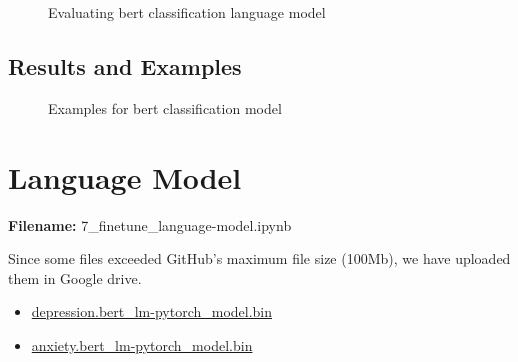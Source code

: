 \documentclass[12pt, a4paper]{article}
\begin{document}
\begin{figure}[H]
	\caption{Evaluating bert classification language model}
	\label{classification-lm_eval}
\end{figure}

\subsection{Results and Examples}
\begin{figure}[H]
	\caption{Examples for bert classification model}
	\label{classification-lm_examples}
\end{figure}


\section{Language Model}
\large{\textbf{Filename:} 7\_finetune\_language-model.ipynb}

Since some files exceeded GitHub's maximum file size (100Mb), we have uploaded them in Google drive. 
\begin{itemize}
	\item \href{https://drive.google.com/file/d/1AmbAl9mFoGG9mITTTz7TRgPEwVUAiN9U/view?usp=sharing}{depression.bert\_lm-pytorch\_model.bin}
	\item
	\href{https://drive.google.com/file/d/19-KhVSsBFo7WpfzeXNKDpUnYKv5xfDkY/view?usp=sharing}{anxiety.bert\_lm-pytorch\_model.bin}
\end{itemize}
\end{document}
